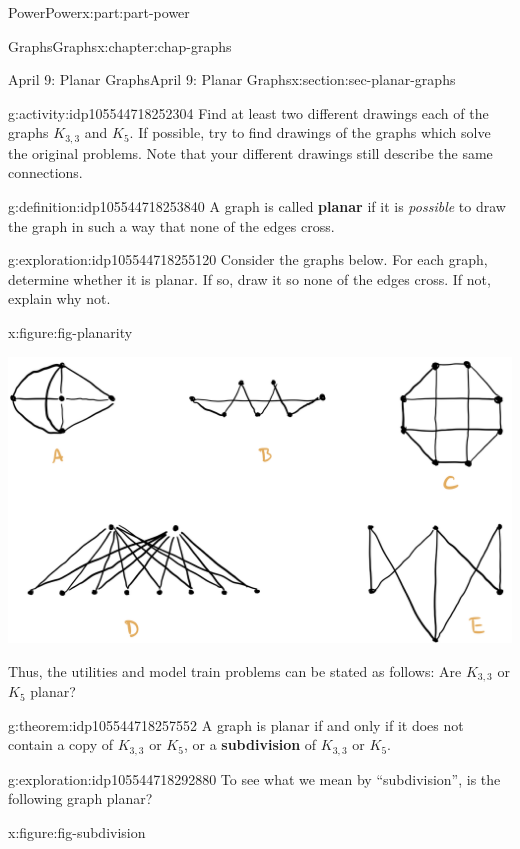 \documentclass[oneside,10pt,]{book}
\newcommand{\terminology}[1]{\textbf{#1}}
\numberwithin{equation}{section}
\begin{document}
\begin{partptx}{Power}{}{Power}{}{}{x:part:part-power}
\begin{chapterptx}{Graphs}{}{Graphs}{}{}{x:chapter:chap-graphs}
\begin{sectionptx}{April 9: Planar Graphs}{}{April 9: Planar Graphs}{}{}{x:section:sec-planar-graphs}
\begin{activity}{}{g:activity:idp105544718252304}%
Find at least two different drawings each of the graphs \(K_{3,3}\) and \(K_5\). If possible, try to find drawings of the graphs which solve the original problems. Note that your different drawings still describe the same connections.%
\end{activity}%
\begin{definition}{}{g:definition:idp105544718253840}%
A graph is called \terminology{planar} if it is \emph{possible} to draw the graph in such a way that none of the edges cross.%
\end{definition}
\begin{exploration}{}{g:exploration:idp105544718255120}%
Consider the graphs below. For each graph, determine whether it is planar. If so, draw it so none of the edges cross. If not, explain why not.%
\begin{figureptx}{}{x:figure:fig-planarity}{}%
\begin{image}{0.175}{0.65}{0.175}%
\includegraphics[width=\linewidth]{./images/planarity.png}
\end{image}%
\tcblower
\end{figureptx}%
\end{exploration}%
Thus, the utilities and model train problems can be stated as follows: Are \(K_{3,3}\) or \(K_5\) planar?%
\begin{theorem}{}{}{g:theorem:idp105544718257552}%
A graph is planar if and only if it does not contain a copy of \(K_{3,3}\) or \(K_5\), or a \terminology{subdivision} of \(K_{3,3}\) or  \(K_5\).\end{theorem}
\begin{exploration}{}{g:exploration:idp105544718292880}%
To see what we mean by ``subdivision'', is the following graph planar?%
\begin{figureptx}{}{x:figure:fig-subdivision}{}%

\end{figureptx}
\end{exploration}
\end{sectionptx}
\end{chapterptx}
\end{partptx}
\end{document}
